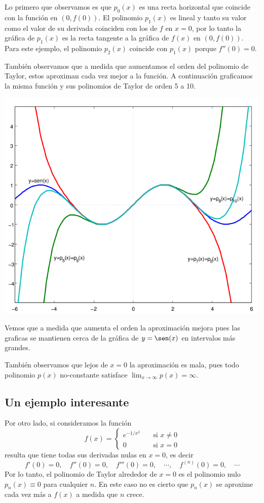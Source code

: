Lo primero que observamos es que $p_0(x)$ es una recta horizontal que coincide con la función en $(0, f(0))$. El polinomio $p_1(x)$ es lineal y tanto su valor como el valor de su derivada coinciden con los de $f$ en $x=0$, por lo tanto la gráfica de $p_1(x)$ es la recta tangente a la gráfica de $f(x)$ en $(0,f(0))$. Para este ejemplo, el polinomio $p_2(x)$ coincide con $p_1(x)$ porque $f''(0) = 0$.

También observamos que a medida que aumentamos el orden del polinomio de Taylor, estos aproximan cada vez mejor a la función. A continuación graficamos la misma función y sus polinomios de Taylor de orden 5 a 10. 

\centerline{\includegraphics[width=.6\textwidth]{pics/taylor-seno-2.png}}

Vemos que a medida que aumenta el orden la aproximación mejora pues las graficas se mantienen cerca de la gráfica de $y=\sen(x)$ en intervalos más grandes.

También observamos que lejos de $x=0$ la aproximación es mala, pues todo polinomio $p(x)$ no-constante satisface $\lim_{x\to\infty} p(x) = \infty$.

\subsection*{Un ejemplo interesante}
Por otro lado, si consideramos la función 
\[
 f(x) = \begin{cases}
         e^{-1/x^2} \quad &\text{si } x \neq 0 \\
         0          \quad &\text{si } x = 0 
        \end{cases}
\]
resulta que tiene todas sus derivadas nulas en $x = 0$, es decir
\[
 f'(0) = 0, \quad f''(0) = 0, \quad f'''(0) = 0,\quad  \cdots, \quad f^{(n)}(0) = 0, \quad \cdots
\]
Por lo tanto, el polinomio de Taylor alrededor de $x = 0$ es el polinomio nulo $p_n(x) \equiv 0$ para cualquier $n$.
En este caso no es cierto que $p_n(x)$ se aproxime cada vez más a $f(x)$ a medida que $n$ crece.

